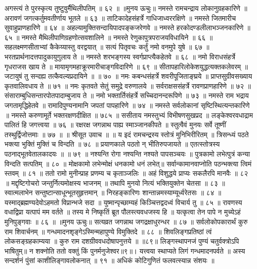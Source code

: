 अगस्त्यं ते पुरस्कृत्य तुष्टुवुर्मैथिलीपतिम् ॥ ६२ ॥
॥मुनय ऊचुः॥
नमस्ते रामचन्द्राय लोकानुग्रहकारिणे ॥
अरावणं जगत्कर्तुमवतीर्णाय भूतले ॥ ६३ ॥
ताटिकादेहसंहर्त्रे गाधिजाध्वररक्षिणे ॥
नमस्ते जितमारीच सुवाहुप्राणहारिणे ॥ ६४ ॥
अहल्यामुक्तिसन्दायिपादपङ्कजरेणवे ॥
नमस्ते हरकोदण्डलीलाभञ्जनकारिणे ॥ ६५ ॥
नमस्ते मैथिलीपाणिग्रहणोत्सवशालिने ॥
नमस्ते रेणुकापुत्रपराजयविधायिने ॥ ६६ ॥
सहलक्ष्मणसीताभ्यां कैकेय्यास्तु वरद्वयात् ॥
सत्यं पितृवचः कर्तुं नमो वनमुपे युषे ॥ ६७ ॥
भरतप्रार्थनादत्तपादुकायुगुलाय ते ॥
नमस्ते शरभङ्गस्य स्वर्गप्राप्त्यैकहेतवे ॥ ६८ ॥
नमो विराधसंहर्त्रे गृधराजस खाय ते ॥
मायामृगमहाक्रूरमारीचाङ्गविदारिणे ॥ ६९ ॥
सीतापहारिलोकेशयुद्धत्यक्तकलेवरम् ॥
जटायुषं तु सन्दह्य तत्कैवल्यप्रदायिने ॥ ॥ ७० ॥
नमः कबन्धसंहर्त्रे शवरीपूजिताङ्घ्रये ॥
प्राप्तसुग्रीवसख्याय कृतवालिवधाय ते ॥ ७१ ॥
नमः कृतवते सेतुं समुद्रे वरुणालये ॥
सर्वराक्षससंहर्त्रे रावणप्राणहारिणे ॥ ७२ ॥
संसाराम्बुधिसन्तारपोतपादाम्बुजाय ते ॥
नमो भक्तार्तिसंहर्त्रे सच्चिदानन्दरूपिणे ॥ ७३ ॥
नमस्ते राम भद्राय जगतामृद्धिहेतवे ॥
रामादिपुण्यनामानि जपतां पापहारिणे ॥ ७४ ॥
नमस्ते सर्वलोकानां सृष्टिस्थित्यन्तकारिणे ॥
नमस्ते करुणामूर्ते भक्तरक्षणदीक्षित ॥ ७८५ ॥
ससीताय नमस्तुभ्यं विभीषणसुखप्रद ॥
लङ्केश्वरवधाद्राम पालितं हि जगत्त्वया ॥ ७६ ॥
रक्षरक्ष जगन्नाथ पाह्य स्माञ्जानकीपते ॥
स्तुत्वैवं मुनयः सर्वे तूष्णीं तस्थुर्द्विजोत्तमाः ॥ ७७ ॥
॥ श्रीसूत उवाच ॥ ॥
य इदं रामचन्द्रस्य स्तोत्रं मुनिभिरीरितम् ॥
त्रिसन्ध्यं पठते भक्त्या भुक्तिं मुक्तिं च विन्दति ॥ ७८ ॥
प्रयाणकाले पठतो न् भीतिरुपजायते ॥
एतत्स्तोत्रस्य पठनाद्भूतवेतालकादयः ॥ ॥ ७९ ॥
नश्यन्ति रोगा नश्यन्ति नश्यते पापसञ्चयः ॥
पुत्रकामो लभेत्पुत्रं कन्या विन्दति सत्पतिम् ॥ ८० ॥
मोक्षकामो लभेन्मोक्षं धनकामो धनं लभेत्॥
सर्वान्कामानवाप्नोति पठन्भक्त्या त्विमं स्तवम् ॥ ८१ ॥
ततो रामो मुनीन्प्राह प्रणम्य च कृताञ्जलिः ॥
अहं विशुद्धये प्राप्यः सकलैरपि मानवैः ॥ ८२ ॥
मद्दृष्टिगोचरो जन्तुर्नित्यमोक्षस्य भाजनम् ॥
तथापि मुनयो नित्यं भक्तियुक्तेन चेतसा ॥ ८३ ॥
स्वात्मलाभेन सन्तुष्टान्साधून्भूतसुहृत्तमान् ॥
निरहङ्कारिणः शान्तान्नमस्याम्यूर्ध्वरेतसः ॥ ८४ ॥
यस्माद्ब्रह्मण्यदेवोऽहमतो विप्रान्भजे सदा ॥
युष्मान्पृच्छाम्यहं किञ्चित्तद्वदध्वं विचार्य तु ॥ ८५ ॥
रावणस्य वधाद्विप्रा यत्पापं मम वर्तते ॥
तस्य मे निष्कृतिं ब्रूत पौलस्त्यवधजस्य हि ॥
यत्कृत्वा तेन पापे न मुच्येऽहं मुनिपुङ्गवाः ॥ ८६ ॥
॥मुनय ऊचुः॥
सत्यव्रत जगन्नाथ जगद्रक्षाधुरन्धर ॥ ८७ ॥
सर्वलोकोपकारार्थं कुरु राम शिवार्चनम् ॥
गन्धमादनशृङ्गेऽस्मिन्महापुण्ये विमुक्तिदे ॥ ८८ ॥
शिवलिङ्गप्रतिष्ठां त्वं लोकसङ्ग्रहकाम्यया ॥
कुरु राम दशग्रीववधदोषापनुत्तये ॥ ॥८९॥
लिङ्गस्थापनजं पुण्यं चतुर्वक्त्रोऽपि भाषितुम्॥
न शक्नोति ततो वक्तुं किं पुनर्मनुजेश्वर॥९॥।
यत्त्वया स्थाप्यते लिगं गन्धमादनपर्वते ॥
अस्य सन्दर्शनं पुंसां काशीलिङ्गावलोकनात् ॥ ९१ ॥
अधिकं कोटिगुणितं फलवत्स्यान्न संशयः ॥
